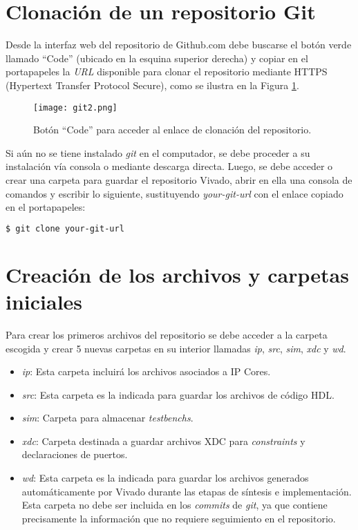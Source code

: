 \section{Clonación de un repositorio Git}

	Desde la interfaz web del repositorio de Github.com debe buscarse el botón verde llamado ``Code'' (ubicado en la esquina superior derecha) y copiar en el portapapeles la \textit{URL} disponible para clonar el repositorio mediante HTTPS (Hypertext Transfer Protocol Secure), como se ilustra en la Figura \ref{fig:git2}.
	
	\begin{figure}[ht]
		\centering
		\texttt{[image: git2.png]}
		\caption{Botón ``Code'' para acceder al enlace de clonación del repositorio.}
		\label{fig:git2}
	\end{figure}
	
	Si aún no se tiene instalado \textit{git} en el computador, se debe proceder a su instalación vía consola o mediante descarga directa. Luego, se debe acceder o crear una carpeta para guardar el repositorio Vivado, abrir en ella una consola de comandos y escribir lo siguiente, sustituyendo \textit{your-git-url} con el enlace copiado en el portapapeles:

\begin{lstlisting}[language=bash]
$ git clone your-git-url
\end{lstlisting}


\section{Creación de los archivos y carpetas iniciales}

	Para crear los primeros archivos del repositorio se debe acceder a la carpeta escogida y crear 5 nuevas carpetas en su interior llamadas \textit{ip}, \textit{src},  \textit{sim}, \textit{xdc} y \textit{wd}.
	
	\begin{itemize}
		\item \textit{ip}: Esta carpeta incluirá los archivos asociados a IP Cores.
		\item \textit{src}: Esta carpeta es la indicada para guardar los archivos de código HDL.
		\item \textit{sim}: Carpeta para almacenar \textit{testbenchs}.
		\item \textit{xdc}: Carpeta destinada a guardar archivos XDC para \textit{constraints} y declaraciones de puertos.
		\item \textit{wd}: Esta carpeta es la indicada para guardar los archivos generados automáticamente por Vivado durante las etapas de síntesis e implementación. Esta carpeta no debe ser incluida en los \textit{commits} de \textit{git}, ya que contiene precisamente la información que no requiere seguimiento en el repositorio.	
	\end{itemize}
	
